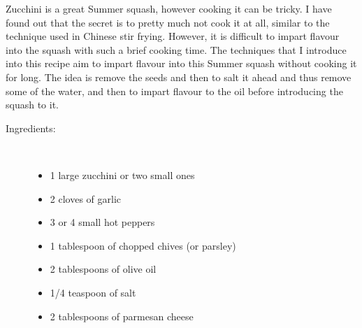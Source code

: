 \documentclass[11pt,letterpaper]{article}
\begin{document}


Zucchini is a great Summer squash, however cooking it can be tricky. I have found out that the secret is to pretty much not cook it at all, similar to the technique used in Chinese stir frying. However, it is difficult to impart flavour into the squash with such a brief cooking time. The techniques that I introduce into this recipe aim to impart flavour into this Summer squash without cooking it for long. The idea is remove the seeds and then to salt it ahead and thus remove some of the water, and then to impart flavour to the oil before introducing the squash to it. 

\begin{description}

\item[Ingredients:]\ \\
	\begin{itemize}
	\item 1 large zucchini or two small ones
	\item 2 cloves of garlic
	\item 3 or 4 small hot peppers
	\item 1 tablespoon of chopped chives (or parsley)
	\item 2 tablespoons of olive oil
	\item 1/4 teaspoon of salt
        \item 2 tablespoons of parmesan cheese
	\end{itemize}


\end{description}
\end{document}
